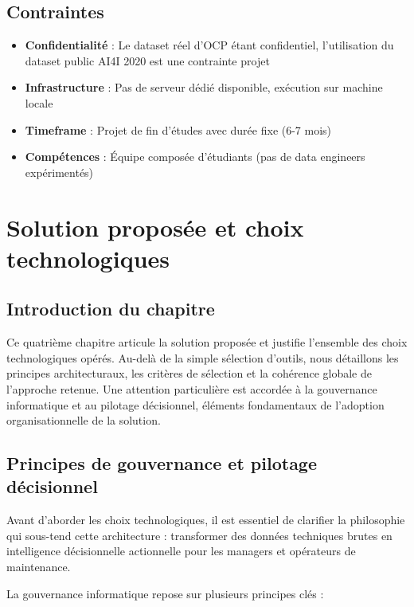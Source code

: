 \documentclass[a4paper,12pt,twoside]{report}
\begin{document}
\section{Contraintes}

\begin{itemize}
    \item \textbf{Confidentialité} : Le dataset réel d'OCP étant confidentiel, l'utilisation du dataset public AI4I 2020 est une contrainte projet
    \item \textbf{Infrastructure} : Pas de serveur dédié disponible, exécution sur machine locale
    \item \textbf{Timeframe} : Projet de fin d'études avec durée fixe (6-7 mois)
    \item \textbf{Compétences} : Équipe composée d'étudiants (pas de data engineers expérimentés)
\end{itemize}

\chapter{Solution proposée et choix technologiques}

\section*{Introduction du chapitre}

Ce quatrième chapitre articule la solution proposée et justifie l'ensemble des choix technologiques opérés. Au-delà de la simple sélection d'outils, nous détaillons les principes architecturaux, les critères de sélection et la cohérence globale de l'approche retenue. Une attention particulière est accordée à la gouvernance informatique et au pilotage décisionnel, éléments fondamentaux de l'adoption organisationnelle de la solution.

\section{Principes de gouvernance et pilotage décisionnel}

Avant d'aborder les choix technologiques, il est essentiel de clarifier la philosophie qui sous-tend cette architecture : transformer des données techniques brutes en intelligence décisionnelle actionnelle pour les managers et opérateurs de maintenance.

La gouvernance informatique repose sur plusieurs principes clés :
\end{document}
